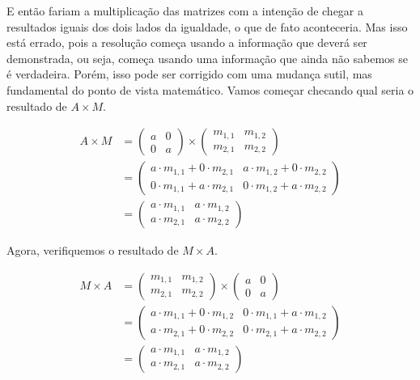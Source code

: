 \documentclass[main_estudante.tex]{subfiles}
\begin{document}
E então fariam a multiplicação das matrizes com a intenção de chegar a resultados iguais dos dois lados da igualdade, o que de fato aconteceria. Mas isso está errado, pois a resolução começa usando a informação que deverá ser demonstrada, ou seja, começa usando uma informação que ainda não sabemos se é verdadeira. Porém, isso pode ser corrigido com uma mudança sutil, mas fundamental do ponto de vista matemático. Vamos começar checando qual seria o resultado de $A \times M$.

\begin{equation*}\begin{align}
A \times M & {} = \begin{pmatrix}a & 0 \\ 0 & a\end{pmatrix} \times \begin{pmatrix}m_{1,1} & m_{1,2} \\ m_{2,1} & m_{2,2}\end{pmatrix} \\
& {} = \begin{pmatrix}a \cdot m_{1,1} + 0 \cdot m_{2,1} & a \cdot m_{1,2} + 0 \cdot m_{2,2} \\  0 \cdot m_{1,1} + a \cdot m_{2,1} & 0 \cdot m_{1,2} + a \cdot m_{2,2}\end{pmatrix} \\
& {} = \begin{pmatrix}a \cdot m_{1,1} & a \cdot m_{1,2} \\ a \cdot m_{2,1} & a \cdot m_{2,2}\end{pmatrix}
\end{align}\end{equation*}

Agora, verifiquemos o resultado de $M \times A$.

\begin{equation*}\begin{align}
M \times A & {} = \begin{pmatrix}m_{1,1} & m_{1,2} \\ m_{2,1} & m_{2,2}\end{pmatrix} \times \begin{pmatrix}a & 0 \\ 0 & a\end{pmatrix} \\
& {} = \begin{pmatrix}a \cdot m_{1,1} + 0 \cdot m_{1,2} & 0 \cdot m_{1,1} + a \cdot m_{1,2} \\  a \cdot m_{2,1} + 0 \cdot m_{2,2} & 0 \cdot m_{2,1} + a \cdot m_{2,2}\end{pmatrix} \\
& {} = \begin{pmatrix}a \cdot m_{1,1} & a \cdot m_{1,2} \\ a \cdot m_{2,1} & a \cdot m_{2,2}\end{pmatrix}
\end{align}\end{equation*}
\end{document}
